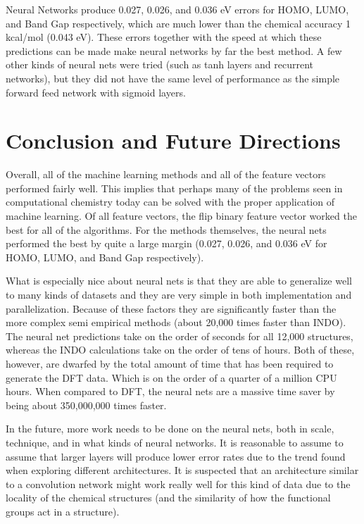 \documentclass[10pt, oneside]{article}   	%
\begin{document}
Neural Networks produce 0.027, 0.026, and 0.036 eV errors for HOMO, LUMO, and Band Gap respectively, which are much lower than the chemical accuracy 1 kcal/mol (0.043 eV). These errors together with the speed at which these predictions can be made make neural networks by far the best method. A few other kinds of neural nets were tried (such as tanh layers and recurrent networks), but they did not have the same level of performance as the simple forward feed network with sigmoid layers.


\section{Conclusion and Future Directions}

Overall, all of the machine learning methods and all of the feature vectors performed fairly well. This implies that perhaps many of the problems seen in computational chemistry today can be solved with the proper application of machine learning. Of all feature vectors, the flip binary feature vector worked the best for all of the algorithms. For the methods themselves, the neural nets performed the best by quite a large margin (0.027, 0.026, and 0.036 eV for HOMO, LUMO, and Band Gap respectively).

What is especially nice about neural nets is that they are able to generalize well to many kinds of datasets and they are very simple in both implementation and parallelization. Because of these factors they are significantly faster than the more complex semi empirical methods (about 20,000 times faster than INDO). The neural net predictions take on the order of seconds for all 12,000 structures, whereas the INDO calculations take on the order of tens of hours. Both of these, however, are dwarfed by the total amount of time that has been required to generate the DFT data. Which is on the order of a quarter of a million CPU hours. When compared to DFT, the neural nets are a massive time saver by being about 350,000,000 times faster.

In the future, more work needs to be done on the neural nets, both in scale, technique, and in what kinds of neural networks. It is reasonable to assume to assume that larger layers will produce lower error rates due to the trend found when exploring different architectures. It is suspected that an architecture similar to a convolution network might work really well for this kind of data due to the locality of the chemical structures (and the similarity of how the functional groups act in a structure).
\end{document}
